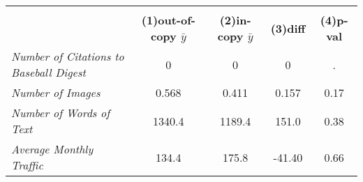 {
\def\sym#1{\ifmmode^{#1}\else\(^{#1}\)\fi}
\begin{tabular}{l*{1}{cccc}}
\toprule
                    &\multicolumn{4}{c}{}                               \\
                    &\textbf{(1)out-of-copy $\bar{y}$}&\textbf{(2)in-copy $\bar{y}$}&\textbf{(3)diff}&\textbf{(4)p-val}\\
\midrule
\emph{Number of Citations to Baseball Digest}&           0&           0&           0&           .\\
\emph{Number of Images}&       0.568&       0.411&       0.157&        0.17\\
\emph{Number of Words of Text}&      1340.4&      1189.4&       151.0&        0.38\\
\emph{Average Monthly Traffic}&       134.4&       175.8&      -41.40&        0.66\\
\bottomrule
\end{tabular}
}
